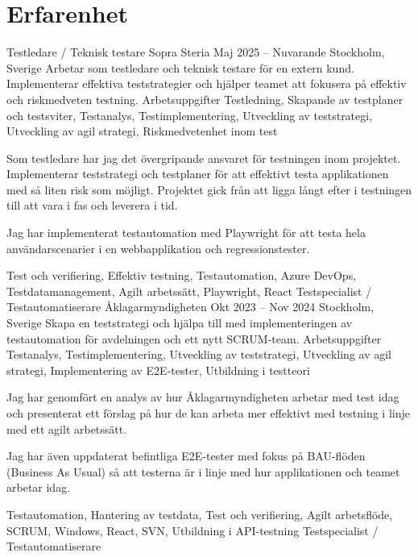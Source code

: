 \documentclass{sobCV}[2015/09/08]
\begin{document}
\section{Erfarenhet}
\experiencenode
   {Testledare / Teknisk testare}
   {Sopra Steria}
   {Maj 2025 -- Nuvarande}
   {Stockholm, Sverige}{
       Arbetar som testledare och teknisk testare för en extern kund. Implementerar effektiva teststrategier och hjälper teamet att fokusera på effektiv och riskmedveten testning.
   }
   {Arbetsuppgifter}{
       Testledning,
       Skapande av testplaner och testsviter,
       Testanalys,
       Testimplementering,
       Utveckling av teststrategi,
       Utveckling av agil strategi,
       Riskmedvetenhet inom test
 }{
      {
         Som testledare har jag det övergripande ansvaret för testningen inom projektet. Implementerar teststrategi och testplaner för att effektivt testa applikationen med så liten risk som möjligt. Projektet gick från att ligga långt efter i testningen till att vara i fas och leverera i tid.

         Jag har implementerat testautomation med Playwright för att testa hela användarscenarier i en webbapplikation och regressionstester.
     }
 }{
     Test och verifiering,
     Effektiv testning,
     Testautomation,
     Azure DevOps,
     Testdatamanagement,
     Agilt arbetssätt,
     Playwright,
     React
}
   \experiencenode
   {Testspecialist / Testautomatiserare}
   {Åklagarmyndigheten}
    {Okt 2023 -- Nov 2024}
   {Stockholm, Sverige}{
       Skapa en teststrategi och hjälpa till med implementeringen av testautomation för avdelningen och ett nytt SCRUM-team.
   }
   {Arbetsuppgifter}{
       Testanalys,
       Testimplementering,
       Utveckling av teststrategi,
       Utveckling av agil strategi,
       Implementering av E2E-tester,
       Utbildning i testteori
 }{
      {
       Jag har genomfört en analys av hur Åklagarmyndigheten arbetar med test idag och presenterat ett förslag på hur de kan arbeta mer effektivt med testning i linje med ett agilt arbetssätt.

       Jag har även uppdaterat befintliga E2E-tester med fokus på BAU-flöden (Business As Usual) så att testerna är i linje med hur applikationen och teamet arbetar idag.
     }
 }{
     Testautomation,
     Hantering av testdata,
     Test och verifiering,
     Agilt arbetsflöde,
     SCRUM,
     Windows,
     React,
     SVN,
     Utbildning i API-testning
}
\experiencenode
   {Testspecialist / Testautomatiserare}
\end{document}
